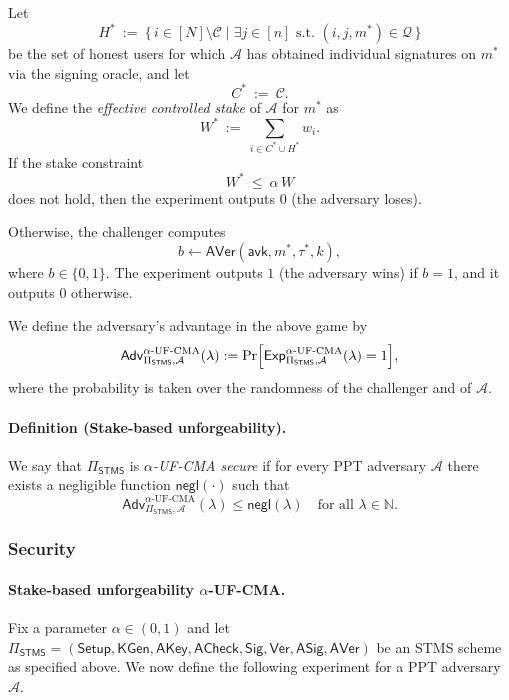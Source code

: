 \documentclass{article}
\begin{document}
\begin{enumerate}
    Let
    \[
      H^\ast \ :=\ \bigl\{\, i \in [N] \setminus \mathcal{C} \;\big|\; \exists j \in [n] \text{ s.t. } (i,j,m^\ast) \in \mathcal{Q} \,\bigr\}
    \]
    be the set of honest users for which $\mathcal{A}$ has obtained individual signatures on $m^\ast$ via the signing oracle, and let
    \[
      C^\ast \ :=\ \mathcal{C}.
    \]
    We define the \emph{effective controlled stake} of $\mathcal{A}$ for $m^\ast$ as
    \[
      W^\ast \ :=\ \sum_{i \in C^\ast \cup H^\ast} w_i.
    \]
    If the stake constraint
    \[
      W^\ast \ \le\ \alpha \, W
    \]
    does not hold, then the experiment outputs $0$ (the adversary loses).
    
    Otherwise, the challenger computes
    \[
      b \leftarrow \mathsf{AVer}(\mathsf{avk}, m^\ast, \tau^\ast, k),
    \]
    where $b \in \{0,1\}$.  The experiment outputs $1$ (the adversary wins) if $b = 1$, and it outputs $0$ otherwise.
\end{enumerate}

We define the adversary's advantage in the above game by
\[
  \mathsf{Adv}^{\alpha\text{-UF-CMA}}_{\Pi_{\mathsf{STMS}},\mathcal{A}}(\lambda)
  :=
  \Pr\Bigl[
    \mathsf{Exp}^{\alpha\text{-UF-CMA}}_{\Pi_{\mathsf{STMS}},\mathcal{A}}(\lambda)
    = 1
  \Bigr],
\]
where the probability is taken over the randomness of the challenger and of $\mathcal{A}$.

\paragraph{Definition (Stake-based unforgeability).}
We say that $\Pi_{\mathsf{STMS}}$ is \emph{$\alpha$-\textsf{UF-CMA} secure} if for every PPT adversary $\mathcal{A}$ there exists a negligible function $\mathsf{negl}(\cdot)$ such that
\[
  \mathsf{Adv}^{\alpha\text{-UF-CMA}}_{\Pi_{\mathsf{STMS}},\mathcal{A}}(\lambda)
  \le \mathsf{negl}(\lambda)
  \quad\text{for all } \lambda \in \mathbb{N}.
\]


\subsubsection{Security}

\paragraph{Stake-based unforgeability $\alpha$-\textsf{UF-CMA}.}
Fix a parameter $\alpha \in (0,1)$ and let
$
  \Pi_{\mathsf{STMS}}
  =
  (\mathsf{Setup}, \mathsf{KGen}, \mathsf{AKey}, \mathsf{ACheck},
   \mathsf{Sig}, \mathsf{Ver}, \mathsf{ASig}, \mathsf{AVer})
$
be an STMS scheme as specified above.
We now define the following experiment for a PPT adversary~$\mathcal{A}$.
\end{document}
